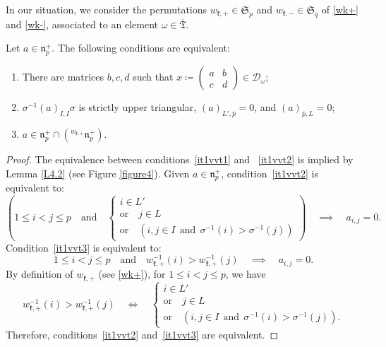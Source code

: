 \documentclass[ALCO,Unicode]{cedram}
\newcommand{\fk}{\mathfrak{k}}
\newcommand{\fn}{\mathfrak{n}}
\newcommand{\subm}[2]{(#1)_{#2}}
\newcommand{\condir}{\mathcal{D}}
\newcommand{\intp}{\overline{p}}
\newcommand{\permutationsof}[1]{\mathfrak{S}_{#1}}
\newcommand{\ppermutationsof}{\mathfrak{T}}
\newcommand{\parameters}{\overline{\ppermutationsof}}
\begin{document}
In our situation, we consider the permutations $w_{\fk,+}\in\permutationsof{p}$ and $w_{\fk,-}\in\permutationsof{q}$
of \eqref{wk+} and \eqref{wk-}, associated to an element $\omega\in\parameters$.

\begin{lemma}
\label{L4.5}
Let $a\in\fn_p^+$. The following conditions are equivalent:
\begin{enumerate}[label=(\arabic*)]
\item \label{it1vvt1}There are matrices $b,c,d$ such that $x\coloneqq \begin{pmatrix} a & b\\ c & d\end{pmatrix}\in\condir_\omega$;
\item \label{it1vvt2} $\sigma^{-1}\subm{a}{I,I}\sigma$ is strictly upper triangular, $\subm{a}{L',\intp}=0$, and $\subm{a}{\intp,L}=0$;
\item\label{it1vvt3} $a\in \fn_p^+\cap({}^{w_{\fk,+}}\fn_p^+)$.
\end{enumerate}
\end{lemma}

\begin{proof}
The equivalence between conditions~\ref{it1vvt1} and ~\ref{it1vvt2} is implied by Lemma \ref{L4.2} (see Figure \ref{figure4}).
Given $a\in\fn_p^+$, condition~\ref{it1vvt2}  is equivalent to:
\begin{equation*}
\left(1\leq i<j\leq p\quad\mbox{and}\quad\left\{\begin{array}{l}
i\in L'\\ \mbox{or}\quad j\in L\\
\mbox{or}\quad(i,j\in I\ \ \mbox{and}\ \ \sigma^{-1}(i)>\sigma^{-1}(j))
\end{array}\right.\right)
\quad\implies\quad a_{i,j}=0.
\end{equation*}
Condition~\ref{it1vvt3} is equivalent to:
\begin{equation*}
1\leq i<j\leq p\quad \mbox{and}\quad w_{\fk,+}^{-1}(i)> w_{\fk,+}^{-1}(j)\quad \implies\quad  a_{i,j}=0.
\end{equation*}
By definition of $w_{\fk,+}$ (see \eqref{wk+}), for $1\leq i<j\leq p$, we have
\[w_{\fk,+}^{-1}(i)> w_{\fk,+}^{-1}(j)\quad\iff\quad \left\{\begin{array}{l}
i\in L'\\ \mbox{or}\quad j\in L\\
\mbox{or}\quad(i,j\in I\ \ \mbox{and}\ \ \sigma^{-1}(i)>\sigma^{-1}(j)).
\end{array}\right.\]
Therefore, conditions~\ref{it1vvt2} and~\ref{it1vvt3} are equivalent.
\end{proof}
\end{document}
